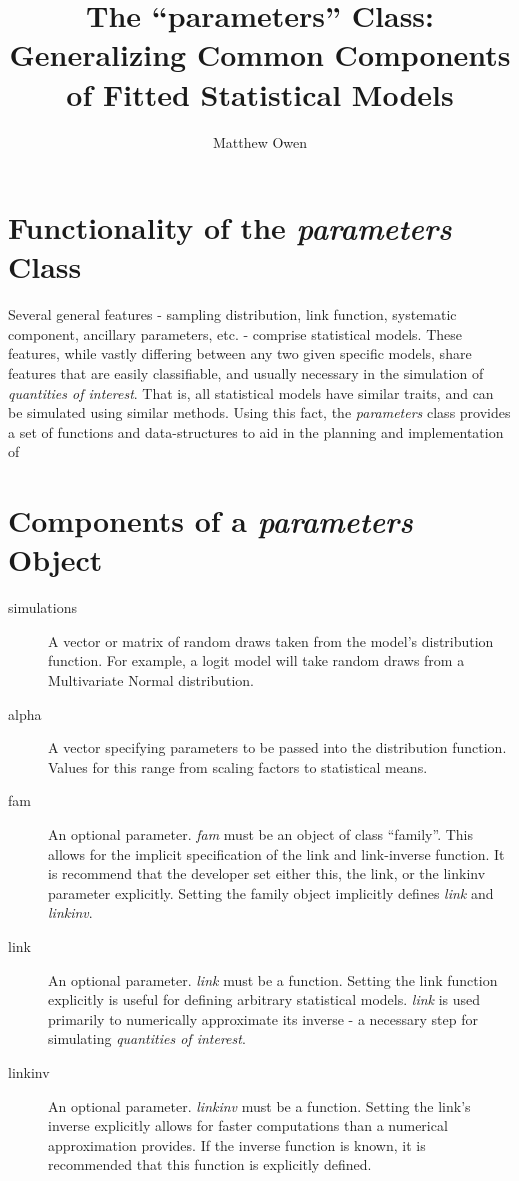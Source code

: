 \documentclass[a4paper,11pt]{article}
\begin{document}
\title{The ``parameters'' Class: Generalizing Common Components of Fitted Statistical Models}
\author{Matthew Owen}
\maketitle

\section{Functionality of the \emph{parameters} Class}

Several general features - sampling distribution, link function, systematic component, ancillary parameters, etc. - comprise statistical models.  These features, while vastly differing between any two given specific models, share features that are easily classifiable, and usually necessary in the simulation of \emph{quantities of interest}.  That is, all statistical models have similar traits, and can be simulated using similar methods.  Using this fact, the \emph{parameters} class provides a set of functions and data-structures to aid in the planning and implementation of 


\section{Components of a \emph{parameters} Object}

\begin{description}
	\item[simulations]{A vector or matrix of random draws taken from the model's distribution function.  For example, a logit model will take random draws from a Multivariate Normal distribution.}
	\item[alpha]{A vector specifying parameters to be passed into the distribution function.  Values for this range from scaling factors to statistical means.}
	\item[fam]{An optional parameter.  \emph{fam} must be an object of class ``family''.  This allows for the implicit specification of the link and link-inverse function.  It is recommend that the developer set either this, the link, or the linkinv parameter explicitly.  Setting the family object implicitly defines \emph{link} and \emph{linkinv}.}
	\item[link]{An optional parameter.  \emph{link} must be a function.  Setting the link function explicitly is useful for defining arbitrary statistical models.  \emph{link} is used primarily to numerically approximate its inverse - a necessary step for simulating \emph{quantities of interest}.}
	\item[linkinv]{An optional parameter.  \emph{linkinv} must be a function.  Setting the link's inverse explicitly allows for faster computations than a numerical approximation provides.  If the inverse function is known, it is recommended that this function is explicitly defined.}
\end{description}
\end{document}
